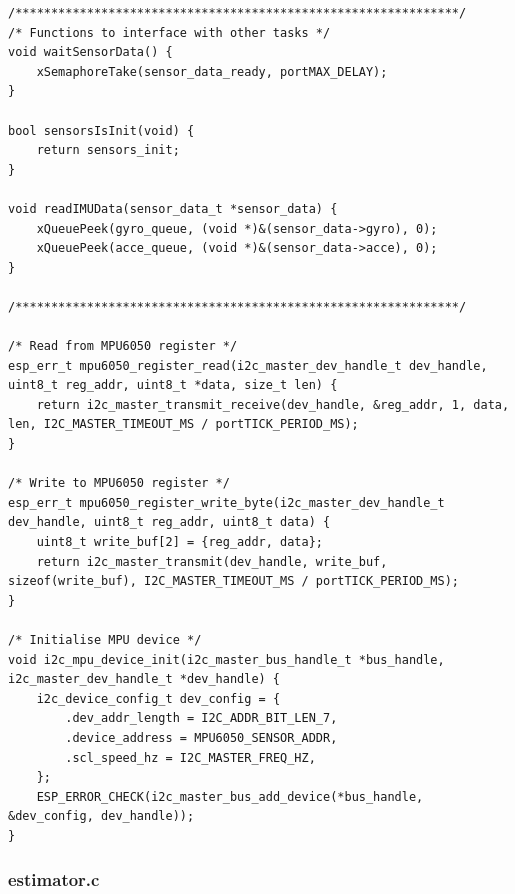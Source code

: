 \begin{lstlisting}[caption={sensors.c}]
/**************************************************************/
/* Functions to interface with other tasks */
void waitSensorData() { 
    xSemaphoreTake(sensor_data_ready, portMAX_DELAY);
}

bool sensorsIsInit(void) {
    return sensors_init;
}

void readIMUData(sensor_data_t *sensor_data) {
    xQueuePeek(gyro_queue, (void *)&(sensor_data->gyro), 0);
    xQueuePeek(acce_queue, (void *)&(sensor_data->acce), 0);
}

/**************************************************************/

/* Read from MPU6050 register */
esp_err_t mpu6050_register_read(i2c_master_dev_handle_t dev_handle, uint8_t reg_addr, uint8_t *data, size_t len) {
    return i2c_master_transmit_receive(dev_handle, &reg_addr, 1, data, len, I2C_MASTER_TIMEOUT_MS / portTICK_PERIOD_MS);
}

/* Write to MPU6050 register */
esp_err_t mpu6050_register_write_byte(i2c_master_dev_handle_t dev_handle, uint8_t reg_addr, uint8_t data) {
    uint8_t write_buf[2] = {reg_addr, data};
    return i2c_master_transmit(dev_handle, write_buf, sizeof(write_buf), I2C_MASTER_TIMEOUT_MS / portTICK_PERIOD_MS);
}

/* Initialise MPU device */
void i2c_mpu_device_init(i2c_master_bus_handle_t *bus_handle, i2c_master_dev_handle_t *dev_handle) {
    i2c_device_config_t dev_config = {
        .dev_addr_length = I2C_ADDR_BIT_LEN_7,
        .device_address = MPU6050_SENSOR_ADDR,
        .scl_speed_hz = I2C_MASTER_FREQ_HZ,
    };
    ESP_ERROR_CHECK(i2c_master_bus_add_device(*bus_handle, &dev_config, dev_handle));
}
\end{lstlisting}

\subsubsection{estimator.c}


